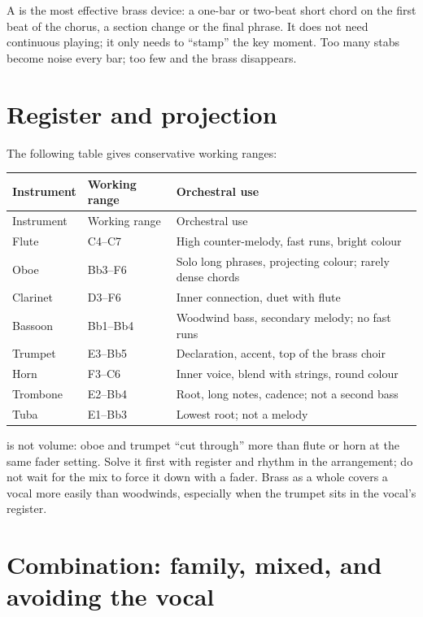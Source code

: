 A  is the most effective brass device: a one-bar or two-beat short chord on the first beat of the chorus, a section change or the final phrase. It does not need continuous playing; it only needs to ``stamp'' the key moment. Too many stabs become noise every bar; too few and the brass disappears.

\section{Register and projection}
\label{sec:winds-ranges}

The following table gives conservative working ranges:

\begin{longtable}{p{}p{}p{}}
\toprule
Instrument & Working range & Orchestral use \\
\midrule
\endfirsthead
\toprule
Instrument & Working range & Orchestral use \\
\midrule
\endhead
Flute & C4--C7 & High counter-melody, fast runs, bright colour \\
Oboe & Bb3--F6 & Solo long phrases, projecting colour; rarely dense chords \\
Clarinet & D3--F6 & Inner connection, duet with flute \\
Bassoon & Bb1--Bb4 & Woodwind bass, secondary melody; no fast runs \\
Trumpet & E3--Bb5 & Declaration, accent, top of the brass choir \\
Horn & F3--C6 & Inner voice, blend with strings, round colour \\
Trombone & E2--Bb4 & Root, long notes, cadence; not a second bass \\
Tuba & E1--Bb3 & Lowest root; not a melody \\
\bottomrule
\end{longtable}

 is not volume: oboe and trumpet ``cut through'' more than flute or horn at the same fader setting. Solve it first with register and rhythm in the arrangement; do not wait for the mix to force it down with a fader. Brass as a whole covers a vocal more easily than woodwinds, especially when the trumpet sits in the vocal's register.

\section{Combination: family, mixed, and avoiding the vocal}
\label{sec:winds-combination}

